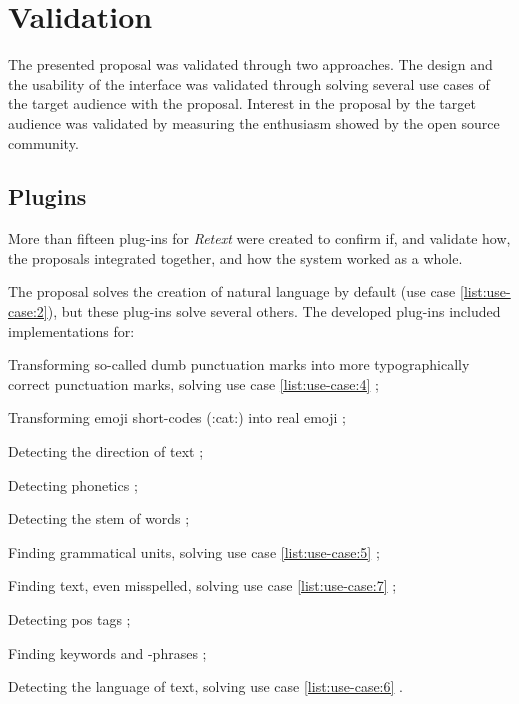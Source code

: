\chapter{Validation}\label{validation}

The presented proposal was validated through two approaches.
The design and the usability of the interface was validated through
  solving several use cases of the target audience with the proposal.
Interest in the proposal by the target audience was validated by
  measuring the enthusiasm showed by the open source community.

\section{Plugins}\label{plugins}

More than fifteen plug-ins for \emph{Retext} were created to confirm if,
  and validate how, the proposals integrated together, and how the system
  worked as a whole.

The proposal solves the creation of natural language by default (use case
  \ref{list:use-case:2}), but these plug-ins solve several others.
The developed plug-ins included implementations for:

\begin{aenumerate}
\item Transforming so-called dumb punctuation marks into more
  typographically correct punctuation marks, solving use case
  \ref{list:use-case:4} \autocite*{wooorm/retext-smartypants-source-code};
\item Transforming emoji short-codes (:cat:) into real emoji
  \autocite*{wooorm/retext-emoji-source-code};
\item Detecting the direction of text
  \autocite*{wooorm/retext-directionality-source-code};
\item Detecting phonetics
  \autocite*{wooorm/retext-double-metaphone-source-code};
\item Detecting the stem of words
  \autocite*{wooorm/retext-porter-stemmer-source-code};
\item Finding grammatical units, solving use case
  \ref{list:use-case:5}  \autocite*{wooorm/retext-visit-source-code};
\item Finding text, even misspelled, solving use case
  \ref{list:use-case:7} \autocite*{wooorm/retext-search-source-code};
\item Detecting \gls{pos} tags \autocite*{wooorm/retext-pos-source-code};
\item Finding keywords and -phrases
  \autocite*{wooorm/retext-keywords-source-code};
\item Detecting the language of text, solving use case \ref{list:use-case:6} 
  \autocite*{wooorm/retext-language-source-code}.
\end{aenumerate}

